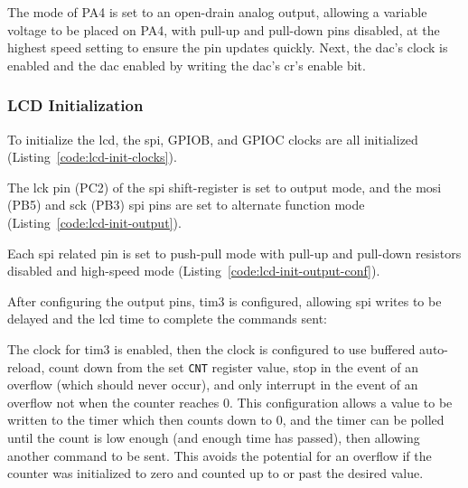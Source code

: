 
The mode of PA4 is set to an open-drain analog output, allowing a
variable voltage to be placed on PA4, with pull-up and pull-down
pins disabled, at the highest speed setting to ensure the pin updates
quickly. Next, the \gls{dac}'s clock is enabled and the \gls{dac}
enabled by writing the \gls{dac}'s \gls{cr}'s enable bit.

\subsubsection{LCD Initialization}

To initialize the \gls{lcd}, the \gls{spi}, GPIOB, and GPIOC clocks are
all initialized (Listing~\ref{code:lcd-init-clocks}).


The \gls{lck} pin (PC2) of the \gls{spi} shift-register is set to output
mode, and the \gls{mosi} (PB5) and \gls{sck} (PB3) \gls{spi} pins are
set to alternate function mode (Listing~\ref{code:lcd-init-output}).


Each \gls{spi} related pin is set to push-pull mode with pull-up and
pull-down resistors disabled and high-speed mode
(Listing~\ref{code:lcd-init-output-conf}).


After configuring the output pins, \gls{tim3} is configured, allowing
\gls{spi} writes to be delayed and the \gls{lcd} time to complete
the commands sent:


The clock for \gls{tim3} is enabled, then the clock is configured to use
buffered auto-reload, count down from the set \lstinline{CNT} register
value, stop in the event of an overflow (which should never occur), and
only interrupt in the event of an overflow not when the counter reaches
0. This configuration allows a value to be written to the timer which
then counts down to 0, and the timer can be polled until the count is
low enough (and enough time has passed), then allowing another command to be
sent. This avoids the potential for an overflow if the counter was
initialized to zero and counted up to or past the desired value. \\

